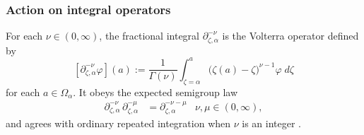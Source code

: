 \documentclass{article}
\theoremstyle{plain}
\newcommand{\R}{\mathbb{R}}
\newcommand{\fracderiv}[3]{\partial^{#1}_{#2, #3}}
\newcommand{\domain}{\Omega}
\begin{document}
\subsubsection{Action on integral operators}\label{sec:L-int-op}
For each $\nu \in (0, \infty)$, the fractional integral $\partial^{-\nu}_{\zeta, \alpha}$ is the Volterra operator defined by
\[ [\partial^{-\nu}_{\zeta, \alpha} \varphi](a) := \frac{1}{\Gamma(\nu)} \int_{\zeta = \alpha}^a \big(\zeta(a)-\zeta\big)^{\nu-1} \varphi\;d\zeta \]
for each $a \in \domain_\alpha$. It obeys the expected semigroup law \cite[Section~1.3]{mladenov2014advanced}
\begin{align*}
\fracderiv{-\nu}{\zeta}{\alpha}\,\fracderiv{-\mu}{\zeta}{\alpha} & = \fracderiv{-\nu-\mu}{\zeta}{\alpha} & \nu, \mu \in (0, \infty),
\end{align*}
and agrees with ordinary repeated integration when $\nu$ is an integer \cite[Equation~35]{mladenov2014advanced}.



\end{document}
